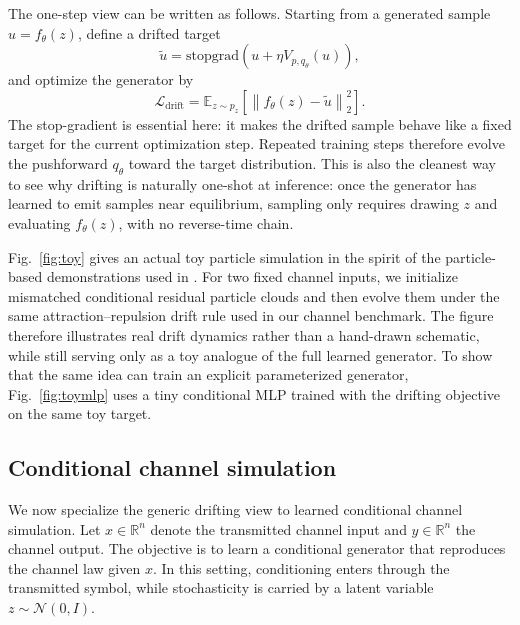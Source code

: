\documentclass[conference]{IEEEtran}
\begin{document}
The one-step view can be written as follows.
Starting from a generated sample \(u = f_\theta(z)\), define a drifted target
\begin{equation}
\tilde{u}
=
\mathrm{stopgrad}\!\left(
u + \eta V_{p,q_\theta}(u)
\right),
\end{equation}
and optimize the generator by
\begin{equation}
\mathcal{L}_{\text{drift}}
=
\mathbb{E}_{z \sim p_z}
\left[
\left\|
f_\theta(z) - \tilde{u}
\right\|_2^2
\right].
\end{equation}
The stop-gradient is essential here: it makes the drifted sample behave like a fixed target for the current optimization step.
Repeated training steps therefore evolve the pushforward \(q_\theta\) toward the target distribution.
This is also the cleanest way to see why drifting is naturally one-shot at inference:
once the generator has learned to emit samples near equilibrium, sampling only requires drawing \(z\) and evaluating \(f_\theta(z)\), with no reverse-time chain.

Fig.~\ref{fig:toy} gives an actual toy particle simulation in the spirit of the particle-based demonstrations used in \cite{drifting}.
For two fixed channel inputs, we initialize mismatched conditional residual particle clouds and then evolve them under the same attraction--repulsion drift rule used in our channel benchmark.
The figure therefore illustrates real drift dynamics rather than a hand-drawn schematic, while still serving only as a toy analogue of the full learned generator.
To show that the same idea can train an explicit parameterized generator, Fig.~\ref{fig:toymlp} uses a tiny conditional MLP trained with the drifting objective on the same toy target.

\subsection{Conditional channel simulation}
We now specialize the generic drifting view to learned conditional channel simulation.
Let \(x \in \mathbb{R}^n\) denote the transmitted channel input and \(y \in \mathbb{R}^n\) the channel output.
The objective is to learn a conditional generator that reproduces the channel law given \(x\).
In this setting, conditioning enters through the transmitted symbol, while stochasticity is carried by a latent variable \(z \sim \mathcal{N}(0, I)\).
\end{document}
